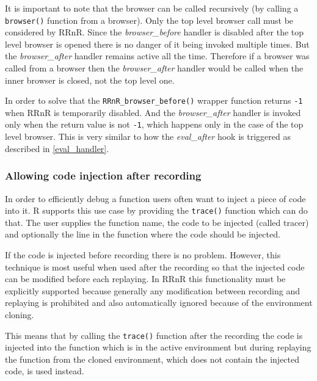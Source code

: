 \documentclass[thesis=M,english,hidelinks]{FITthesis}[2012/10/20]
\begin{document}
			It is important to note that the browser can be called recursively (by calling a \lstinline|browser()| function from a browser). Only the top level browser call must be considered by RRnR. Since the \emph{browser\_before} handler is disabled after the top level browser is opened there is no danger of it being invoked multiple times. But the \emph{browser\_after} handler remains active all the time. Therefore if a browser was called from a browser then the \emph{browser\_after} handler would be called when the inner browser is closed, not the top level one.\par
			
			In order to solve that the \lstinline|RRnR_browser_before()| wrapper function returns \lstinline|-1| when RRnR is temporarily disabled. And the \emph{browser\_after} handler is invoked only when the return value is not \lstinline|-1|, which happens only in the case of the top level browser. This is very similar to how the \emph{eval\_after} hook is triggered as described in \ref{eval_handler}.\par
			
			\subsubsection{Allowing code injection after recording}
			In order to efficiently debug a function users often want to inject a piece of code into it. R supports this use case by providing the \lstinline|trace()| function which can do that. The user supplies the function name, the code to be injected (called tracer) and optionally the line in the function where the code should be injected.\par
			
			If the code is injected before recording there is no problem. However, this technique is most useful when used after the recording so that the injected code can be modified before each replaying. In RRnR this functionality must be explicitly supported because generally any modification between recording and replaying is prohibited and also automatically ignored because of the environment cloning.\par
			
			This means that by calling the \lstinline|trace()| function after the recording the code is injected into the function which is in the active environment but during replaying the function from the cloned environment, which does not contain the injected code, is used instead.\par
			
\end{document}
